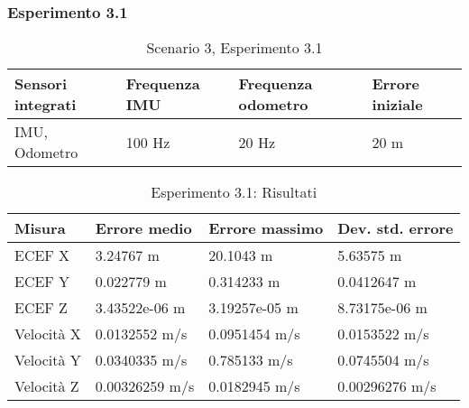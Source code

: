 \subsubsection{Esperimento 3.1}
\begin{table}[h]
	\centering
	\begin{tabular}{|p{3.2cm}|p{2.75cm}|p{2.75cm}|p{2.75cm}|}
		\hline 
		\textbf{Sensori integrati} & \textbf{Frequenza IMU}  & \textbf{Frequenza odometro} & \textbf{Errore iniziale} \\ 
		\hline 
		IMU, Odometro & 100 Hz & 20 Hz & 20 m \\ 
		\hline 
	\end{tabular}
	\caption{Scenario 3, Esperimento 3.1}
\end{table}
\begin{table}[h]
	\centering
	\begin{tabular}{|p{2cm}|p{3.2cm}|p{3cm}|p{3cm}|}
		\hline 
		\textbf{Misura} 
		& \textbf{Errore medio} 
		& \textbf{Errore massimo}
		& \textbf{Dev. std. errore}\\ 
		\hline 
		ECEF X & 3.24767 m & 20.1043 m & 5.63575 m \\ 
		\hline 
		ECEF Y & 0.022779 m & 0.314233 m & 0.0412647 m \\ 
		\hline 
		ECEF Z & 3.43522e-06 m & 3.19257e-05 m & 8.73175e-06 m \\ 
		\hline 
		Velocit\`a X & 0.0132552 m/s & 0.0951454 m/s & 0.0153522 m/s \\ 
		\hline 
		Velocit\`a Y & 0.0340335 m/s & 0.785133 m/s & 0.0745504 m/s \\ 
		\hline 
		Velocit\`a Z & 0.00326259 m/s & 0.0182945 m/s & 0.00296276 m/s \\ 
		\hline 
	\end{tabular} 
	\caption{Esperimento 3.1: Risultati}
\end{table}
